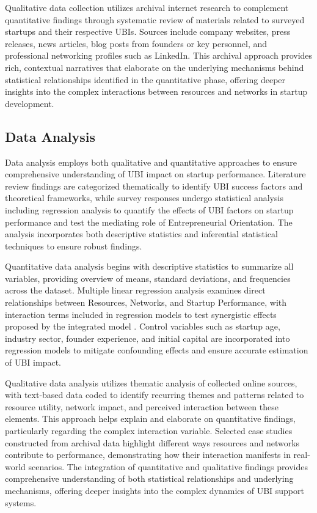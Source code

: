 \documentclass[../Main.tex]{subfiles}
\begin{document}
    Qualitative data collection utilizes archival internet research to complement quantitative findings through systematic review of materials related to surveyed startups and their respective UBIs. Sources include company websites, press releases, news articles, blog posts from founders or key personnel, and professional networking profiles such as LinkedIn. This archival approach provides rich, contextual narratives that elaborate on the underlying mechanisms behind statistical relationships identified in the quantitative phase, offering deeper insights into the complex interactions between resources and networks in startup development.

    \subsection{Data Analysis}
    \label{subsection:4.2.3_Data_analysis}
    Data analysis employs both qualitative and quantitative approaches to ensure comprehensive understanding of UBI impact on startup performance. Literature review findings are categorized thematically to identify UBI success factors and theoretical frameworks, while survey responses undergo statistical analysis including regression analysis to quantify the effects of UBI factors on startup performance and test the mediating role of Entrepreneurial Orientation. The analysis incorporates both descriptive statistics and inferential statistical techniques to ensure robust findings.

    Quantitative data analysis begins with descriptive statistics to summarize all variables, providing overview of means, standard deviations, and frequencies across the dataset. Multiple linear regression analysis examines direct relationships between Resources, Networks, and Startup Performance, with interaction terms included in regression models to test synergistic effects proposed by the integrated model \cite{al2017challenges}. Control variables such as startup age, industry sector, founder experience, and initial capital are incorporated into regression models to mitigate confounding effects and ensure accurate estimation of UBI impact.

    Qualitative data analysis utilizes thematic analysis of collected online sources, with text-based data coded to identify recurring themes and patterns related to resource utility, network impact, and perceived interaction between these elements. This approach helps explain and elaborate on quantitative findings, particularly regarding the complex interaction variable. Selected case studies constructed from archival data highlight different ways resources and networks contribute to performance, demonstrating how their interaction manifests in real-world scenarios. The integration of quantitative and qualitative findings provides comprehensive understanding of both statistical relationships and underlying mechanisms, offering deeper insights into the complex dynamics of UBI support systems.
\end{document}

